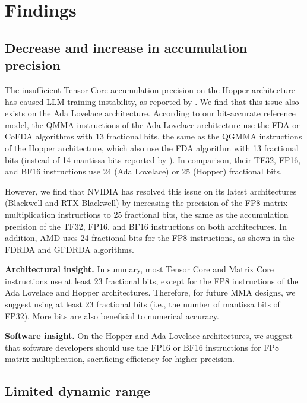 \section{Findings}
\label{sec:findings}


\subsection{Decrease and increase in accumulation precision}

The insufficient Tensor Core accumulation precision on the Hopper architecture has caused LLM training instability, as reported by \cite{deepseek-ai_deepseek-v3_2024}. We find that this issue also exists on the Ada Lovelace architecture. According to our bit-accurate reference model, the QMMA instructions of the Ada Lovelace architecture use the FDA or CoFDA algorithms with 13 fractional bits, the same as the QGMMA instructions of the Hopper architecture, which also use the FDA algorithm with 13 fractional bits (instead of 14 mantissa bits reported by \cite{deepseek-ai_deepseek-v3_2024}). In comparison, their TF32, FP16, and BF16 instructions use 24 (Ada Lovelace) or 25 (Hopper) fractional bits.

However, we find that NVIDIA has resolved this issue on its latest architectures (Blackwell and RTX Blackwell) by increasing the precision of the FP8 matrix multiplication instructions to 25 fractional bits, the same as the accumulation precision of the TF32, FP16, and BF16 instructions on both architectures. In addition, AMD uses 24 fractional bits for the FP8 instructions, as shown in the FDRDA and GFDRDA algorithms.

\textbf{Architectural insight.} In summary, most Tensor Core and Matrix Core instructions use at least 23 fractional bits, except for the FP8 instructions of the Ada Lovelace and Hopper architectures. Therefore, for future MMA designs, we suggest using at least 23 fractional bits (i.e., the number of mantissa bits of FP32). More bits are also beneficial to numerical accuracy.

\textbf{Software insight.} On the Hopper and Ada Lovelace architectures, we suggest that software developers should use the FP16 or BF16 instructions for FP8 matrix multiplication, sacrificing efficiency for higher precision.

\subsection{Limited dynamic range}

